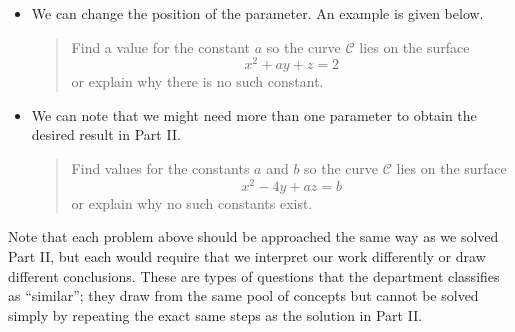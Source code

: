 \documentclass[noauthor, handout]{ximera}
\begin{document}
\begin{problem}
\begin{freeResponse}
\begin{remark}
\begin{itemize}
\item We can change the position of the parameter.  An example is given below.

\begin{quote}
Find a value for the constant $a$ so the curve $\mathcal{C}$ lies on the surface $$x^2+ay +z = 2$$ or explain why there is no such constant.
\end{quote}

\item We can note that we might need more than one parameter to obtain the desired result in Part II.  

\begin{quote}
Find values for the constants $a$ and $b$ so the curve $\mathcal{C}$ lies on the surface $$x^2-4y +az = b$$ or explain why no such constants exist.
\end{quote}

\end{itemize}

Note that each problem above should be approached the same way as we solved Part II, but each would require that we interpret our work differently or draw different conclusions.  These are types of questions that the department classifies as ``similar''; they draw from the same pool of concepts but cannot be solved simply by repeating the exact same steps as the solution in Part II.
\end{remark}

\end{freeResponse}
\end{problem}

\end{document}
